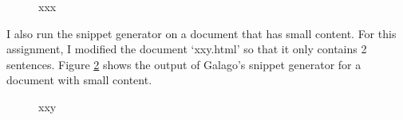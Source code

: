 \documentclass[letterpaper,11pt]{article}
\begin{document}
\begin{figure}[H]
	\centering
	\caption{xxx}
	\label{fig:xxx}
\end{figure}

I also run the snippet generator on a document that has small content. For this assignment, I modified the document `xxy.html' so that it only contains 2 sentences. Figure \ref{fig:xxy} shows the output of Galago's snippet generator for a document with small content. 

\begin{figure}[H]
	\centering
	\caption{xxy}
	\label{fig:xxy}
\end{figure}
\end{document}
